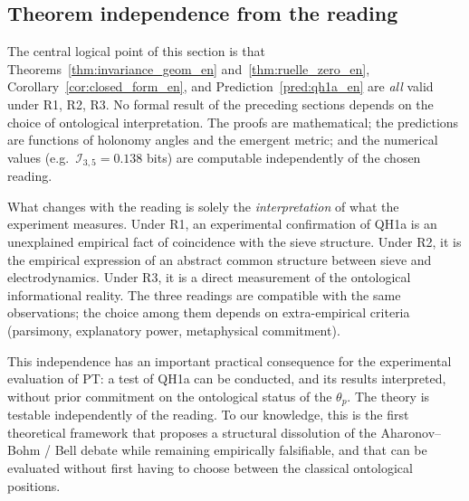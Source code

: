 \subsection{Theorem independence from the reading}
\label{ssec:reading_independence_en}

The central logical point of this section is that
Theorems~\ref{thm:invariance_geom_en}
and~\ref{thm:ruelle_zero_en},
Corollary~\ref{cor:closed_form_en}, and
Prediction~\ref{pred:qh1a_en} are \emph{all} valid under R1, R2,
R3. No formal result of the preceding sections depends on the
choice of ontological interpretation. The proofs are mathematical;
the predictions are functions of holonomy angles and the
emergent metric; and the numerical values (e.g.\
$\mathcal{I}_{3,5} = 0.138$ bits) are computable independently of
the chosen reading.

What changes with the reading is solely the \emph{interpretation}
of what the experiment measures. Under R1, an experimental
confirmation of QH1a is an unexplained empirical fact of
coincidence with the sieve structure. Under R2, it is the
empirical expression of an abstract common structure between
sieve and electrodynamics. Under R3, it is a direct measurement
of the ontological informational reality. The three readings are
compatible with the same observations; the choice among them
depends on extra-empirical criteria (parsimony, explanatory power,
metaphysical commitment).

This independence has an important practical consequence for the
experimental evaluation of PT: a test of QH1a can be conducted,
and its results interpreted, without prior commitment on the
ontological status of the $\theta_p$. The theory is testable
independently of the reading. To our knowledge, this is the
first theoretical framework that proposes a structural
dissolution of the Aharonov--Bohm / Bell debate while remaining
empirically falsifiable, and that can be evaluated without first
having to choose between the classical ontological positions.
